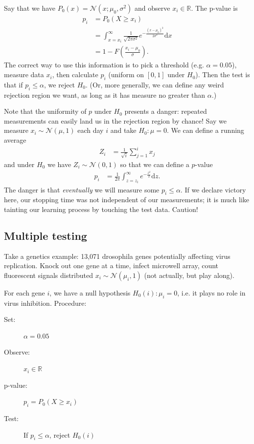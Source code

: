 \documentclass[11pt,letterpaper]{article}
\renewcommand{\d}{\mathrm{d}}
\theoremstyle{definition}
\numberwithin{equation}{section}
\numberwithin{figure}{section}
\begin{document}
Say that we have $P_0(x) = \mathcal{N}(x;\mu_0, \sigma^2)$ and observe $x_i \in \mathbb{R}$. The p-value is
%
\begin{align}
	p_i &= P_0(X \geq x_i)\\
	    &= \int_{x=x_i}^\infty \frac{1}{\sqrt{2\pi\sigma^2}} e^{-\frac{(x-\mu_0)^2}{2\sigma^2}} \d x\\
	    &= 1 - F\left(\frac{x_i-\mu_0}{\sigma}\right).
\end{align}
%
The correct way to use this information is to pick a threshold (e.g. $\alpha = 0.05$), measure data $x_i$, then calculate $p_i$ (uniform on $[0,1]$ under $H_0$). Then the test is that if $p_i \leq \alpha$, we reject $H_0$. (Or, more generally, we can define any weird rejection region we want, as long as it has measure no greater than $\alpha$.)


Note that the uniformity of $p$ under $H_0$ presents a danger: repeated measurements can easily land us in the rejection region by chance! Say we measure $x_i \sim \mathcal{N}(\mu,1)$ each day $i$ and take $H_0: \mu=0$. We can define a running average
%
\begin{align}
	Z_i &= \frac{1}{\sqrt{i}} \sum_{j=1}^i x_j
\end{align}
%
and under $H_0$ we have $Z_i \sim \mathcal{N}(0,1)$ so that we can define a $p$-value
%
\begin{align}
	p_i &= \frac{1}{2\pi} \int_{z=z_i}^\infty e^{-\frac{z^2}{2}} \d z.
\end{align}
%
The danger is that \emph{eventually} we will measure some $p_i \leq \alpha$. If we declare victory here, our stopping time was not independent of our measurements; it is much like tainting our learning process by touching the test data. Caution!










\subsection{Multiple testing}
Take a genetics example: 13,071 drosophila genes potentially affecting virus replication. Knock out one gene at a time, infect microwell array, count fluorescent signals distributed $x_i \sim \mathcal{N}(\mu_i,1)$ (not actually, but play along).

For each gene $i$, we have a null hypothesis $H_0(i) : \mu_i = 0$, i.e. it plays no role in virus inhibition. Procedure:
%
\begin{description}
	\item[Set:] $\alpha=0.05$
	\item[Observe:] $x_i \in \mathbb{R}$
	\item[p-value:] $p_i = P_0(X \geq x_i)$
	\item[Test:] If $p_i \leq \alpha$, reject $H_0(i)$
\end{description}
\end{document}
